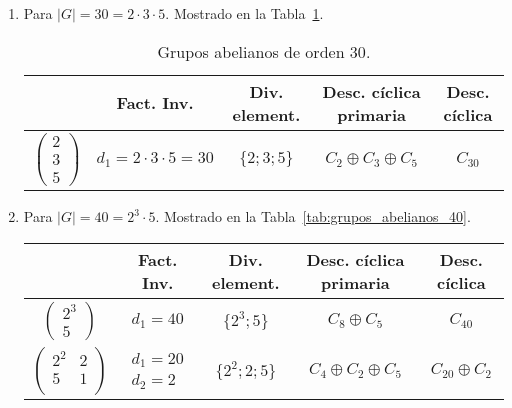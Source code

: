 \begin{ejercicio}
\begin{enumerate}
        \item Para $|G|=30=2\cdot 3\cdot 5$.
        Mostrado en la Tabla~\ref{tab:grupos_abelianos_30}.
        \begin{table}[h]
            \centering
            \begin{tabular}{c|c|c|c|c}
                & \textbf{Fact. Inv.} & \textbf{Div. element.} & \textbf{Desc. cíclica primaria} & \textbf{Desc. cíclica} \\
                \hline
                $\begin{pmatrix}
                    2\\
                    3\\
                    5
                \end{pmatrix}
                $ & $d_1=2\cdot 3\cdot 5=30$ & $\{2; 3; 5\}$ & $C_2 \oplus C_3 \oplus C_5$ & $C_{30}$
            \end{tabular}
            \caption{Grupos abelianos de orden $30$.}
            \label{tab:grupos_abelianos_30}
        \end{table}
        \item Para $|G|=40=2^3\cdot 5$.
        Mostrado en la Tabla~\ref{tab:grupos_abelianos_40}.
        \begin{table}[h]
            \centering
            \begin{tabular}{c|c|c|c|c}
                & \textbf{Fact. Inv.} & \textbf{Div. element.} & \textbf{Desc. cíclica primaria} & \textbf{Desc. cíclica} \\
                \hline
                $\begin{pmatrix}
                    2^3\\
                    5
                \end{pmatrix}
                $ & $d_1=40$ & $\{2^3; 5\}$ & $C_8 \oplus C_5$ & $C_{40}$ \\ \hline
                $\begin{pmatrix}
                    2^2 & 2\\
                    5 & 1\\
                \end{pmatrix}
                $ & $\begin{array}{l}
                    d_1=20 \\
                    d_2=2
                \end{array}$ & $\{2^2; 2; 5\}$ & $C_4 \oplus C_2 \oplus C_5$ & $C_{20} \oplus C_2$ \\ \hline

\end{tabular}
\end{table}
\end{enumerate}
\end{ejercicio}
